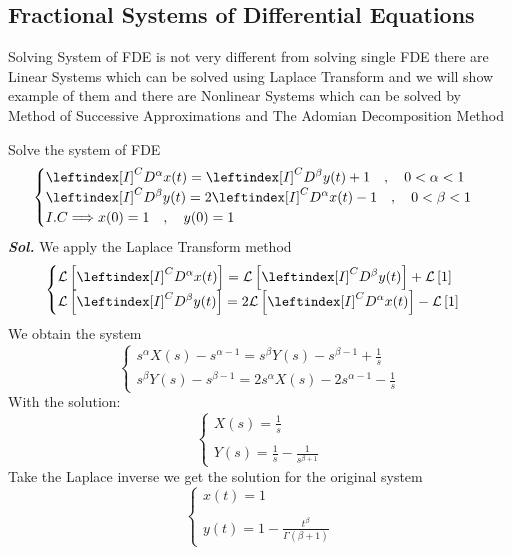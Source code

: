 \subsection{Fractional Systems of Differential Equations}
Solving System of FDE is not very different from solving single FDE 
there are Linear Systems which can be solved using Laplace Transform 
and we will show example of them and there are Nonlinear Systems
which can be solved by Method of Successive Approximations and
The Adomian Decomposition Method

\begin{example}
    Solve the system of FDE
    \[
        \begin{cases}
            \displaystyle \leftindex[I]^C {D^{\alpha}} x(t) = \leftindex[I]^C {D^{\beta}} y(t) + 1  \quad,\quad 0<\alpha<1
            \\
            \displaystyle \leftindex[I]^C {D^{\beta}} y(t) = 2\leftindex[I]^C {D^{\alpha}} x(t) - 1 \quad,\quad 0<\beta<1
            \\
            I.C \Longrightarrow x(0) = 1 \quad,\quad y(0) = 1
        \end{cases}
    \]
    \textit{ \textbf{Sol.} } We apply the Laplace Transform method
    \[
        \begin{cases}
            \displaystyle \mathcal{L}\left[\leftindex[I]^C {D^{\alpha}} x(t) \right]= \mathcal{L}\left[\leftindex[I]^C {D^{\beta}} y(t)\right] + \mathcal{L}\left[1\right]
            \\
            \displaystyle \mathcal{L}\left[\leftindex[I]^C {D^{\beta}} y(t) \right]= 2\mathcal{L}\left[\leftindex[I]^C {D^{\alpha}} x(t)\right] - \mathcal{L}\left[1\right]
        \end{cases}
    \]
    We obtain the system
    \[
        \begin{cases}
            \displaystyle s^\alpha X(s) - s^{\alpha-1} = s^\beta Y(s) - s^{\beta-1} + \frac{1}{s}
            \\
            \displaystyle s^\beta Y(s) - s^{\beta-1} = 2s^\alpha X(s) - 2s^{\alpha-1} - \frac{1}{s}
        \end{cases}
    \]
    With the solution:
    \[
        \begin{cases}
            \displaystyle X(s) = \frac{1}{s}
            \\\\
            \displaystyle Y(s) = \frac{1}{s} - \frac{1}{s^{\beta+1}}
        \end{cases}
    \]
    Take the Laplace inverse we get the solution for the original system
    \[
        \begin{cases}
            \displaystyle x(t) = 1 
            \\\\
            \displaystyle y(t) = 1 - \frac{t^{\beta}}{\Gamma(\beta+1)}
        \end{cases}
    \]
\end{example}